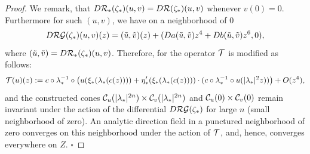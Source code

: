 \begin{proof}
We remark, that $D \mathcal{R}_*(\zeta_*)(u,v)= D \mathcal{R}(\zeta_*)(u,v)$ whenever $v(0)=0$. Furthermore for such $(u,v)$, we have on a neighborhood of $0$
$$D \mathcal{RG}(\zeta_*)(u,v)(z)=(\tilde{u},\tilde{v})(z)+(D a(\tilde{u},\tilde{v}) z^4 + D b(\tilde{u},\tilde{v}) z^6,0),$$
where $(\tilde{u},\tilde{v})=D \mathcal{R}_*(\zeta_*)(u,v)$. Therefore, for the operator $\mathcal{T}$ is modified as follows:
$$\mathcal{T}(u)(z):=c \circ \lambda_*^{-1} \circ \left(u(\xi_*(\lambda_*(c(z))))  +  \eta'_*(\xi_*(\lambda_*(c(z)))) \cdot (c \circ \lambda_*^{-1} \circ  u(|\lambda_*|^2 z )) \right) +O(z^4),
$$
and the constructed cones $\mathcal{C}_u(|\lambda_*|^{2 {n}}) \times \mathcal{C}_v(|\lambda_*|^{2 n})$ and $\mathcal{C}_u(0) \times \mathcal{C}_v(0)$ remain invariant  under the action of the differential $D \mathcal{RG}(\zeta_*)$ for large $n$ (small neighborhood of zero). An analytic direction field in a punctured neighborhood of zero converges on this neighborhood under the action of $\mathcal{T}$, and, hence, converges everywhere on $Z$.
\flushright $\square$
\end{proof}








